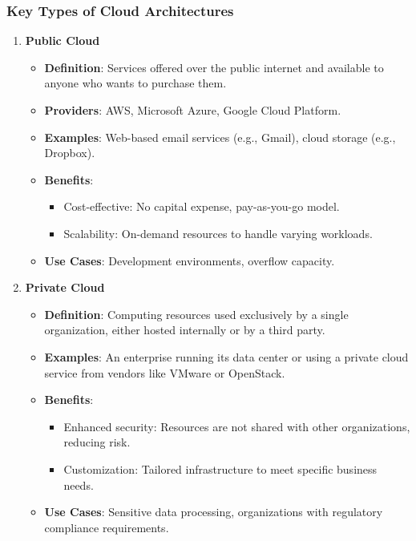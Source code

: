 \documentclass[aspectratio=169]{beamer}
\begin{document}
\begin{frame}[fragile]
  \frametitle{Key Types of Cloud Architectures}
  
  \begin{enumerate}
    \item \textbf{Public Cloud}
      \begin{itemize}
        \item \textbf{Definition}: Services offered over the public internet and available to anyone who wants to purchase them.
        \item \textbf{Providers}: AWS, Microsoft Azure, Google Cloud Platform.
        \item \textbf{Examples}: Web-based email services (e.g., Gmail), cloud storage (e.g., Dropbox).
        \item \textbf{Benefits}:
          \begin{itemize}
            \item Cost-effective: No capital expense, pay-as-you-go model.
            \item Scalability: On-demand resources to handle varying workloads.
          \end{itemize}
        \item \textbf{Use Cases}: Development environments, overflow capacity.
      \end{itemize}

    \item \textbf{Private Cloud}
      \begin{itemize}
        \item \textbf{Definition}: Computing resources used exclusively by a single organization, either hosted internally or by a third party.
        \item \textbf{Examples}: An enterprise running its data center or using a private cloud service from vendors like VMware or OpenStack.
        \item \textbf{Benefits}:
          \begin{itemize}
            \item Enhanced security: Resources are not shared with other organizations, reducing risk.
            \item Customization: Tailored infrastructure to meet specific business needs.
          \end{itemize}
        \item \textbf{Use Cases}: Sensitive data processing, organizations with regulatory compliance requirements.
      \end{itemize}


\end{enumerate}
\end{frame}
\end{document}
